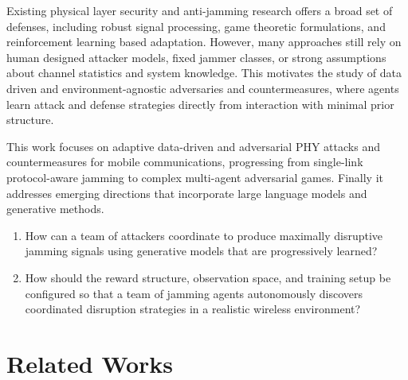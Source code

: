\documentclass[journal]{IEEEtran}
\newcommand{\adm}[1]{{\color{orange}{[#1]}}}
\begin{document}
Existing physical layer security and anti-jamming research offers a broad set of defenses, including robust signal processing, game theoretic formulations, and reinforcement learning based adaptation. However, many approaches still rely on human designed attacker models, fixed jammer classes, or strong assumptions about channel statistics and system knowledge. 
This motivates the study of data driven and environment-agnostic adversaries and countermeasures, where agents learn attack and defense strategies directly from interaction with minimal prior structure.

This work focuses on adaptive data-driven and adversarial PHY attacks and countermeasures for mobile communications, progressing from single-link protocol-aware jamming to complex multi-agent adversarial games.
Finally it addresses emerging directions that incorporate large language models and generative methods.

\begin{enumerate}
    \item How can a team of attackers coordinate to produce maximally disruptive jamming signals using generative models that are progressively learned?
    \item How should the reward structure, observation space, and training setup be configured so that a team of jamming agents autonomously discovers coordinated disruption strategies in a realistic wireless environment?
\end{enumerate}

\section{Related Works}
\end{document}
